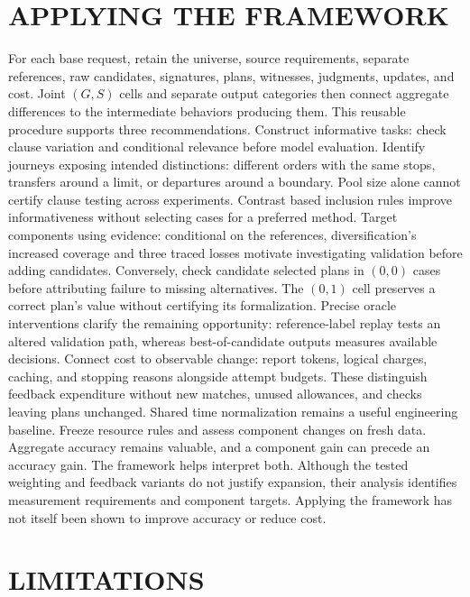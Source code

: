 \documentclass[a4paper,twoside]{article}
\begin{document}
\section{\uppercase{Applying the Framework}}
\label{sec:recommendations}

\noindent For each base request, retain the universe, source requirements, separate references, raw candidates, signatures, plans, witnesses, judgments, updates, and cost. Joint $(G,S)$ cells and separate output categories then connect aggregate differences to the intermediate behaviors producing them. This reusable procedure supports three recommendations.
Construct informative tasks: check clause variation and conditional relevance before model evaluation. Identify journeys exposing intended distinctions: different orders with the same stops, transfers around a limit, or departures around a boundary. Pool size alone cannot certify clause testing across experiments. Contrast based inclusion rules improve informativeness without selecting cases for a preferred method.
Target components using evidence: conditional on the references, diversification's increased coverage and three traced losses motivate investigating validation before adding candidates. Conversely, check candidate selected plans in $(0,0)$ cases before attributing failure to missing alternatives.
The $(0,1)$ cell preserves a correct plan's value without certifying its formalization. Precise oracle interventions clarify the remaining opportunity: reference-label replay tests an altered validation path, whereas best-of-candidate outputs measures available decisions.
Connect cost to observable change: report tokens, logical charges, caching, and stopping reasons alongside attempt budgets. These distinguish feedback expenditure without new matches, unused allowances, and checks leaving plans unchanged. Shared time normalization remains a useful engineering baseline. Freeze resource rules and assess component changes on fresh data.
Aggregate accuracy remains valuable, and a component gain can precede an accuracy gain. The framework helps interpret both. Although the tested weighting and feedback variants do not justify expansion, their analysis identifies measurement requirements and component targets. Applying the framework has not itself been shown to improve accuracy or reduce cost.



\section{\uppercase{Limitations}}
\label{sec:limitations}
\end{document}
